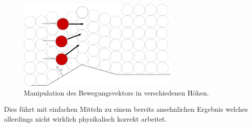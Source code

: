 \begin{Spacing}{\mylinespace}
\begin{figure}[h!]
			\includegraphics[width=0.7\textwidth]{graphics/Phys_flow2.png}
			\caption{ Manipulation des Bewegungsvektors in verschiedenen Höhen. }
			\label{fig:flow1}
		\end{figure}
		Dies führt mit einfachen Mitteln zu einem bereits ansehnlichen Ergebnis
		welches allerdings nicht wirklich physikalisch korrekt arbeitet.
\end{Spacing}
\newpage
\clearpage
